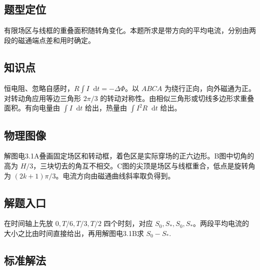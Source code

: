 \documentclass[UTF8,fontset=fandol,a4paper,11pt]{ctexart}
\newcommand{\dd}{\mathop{}\!\mathrm{d}}
\begin{document}


\subsection*{题型定位}

有限场区与线框的重叠面积随转角变化。本题所求是带方向的平均电流，分别由两段的磁通端点差和用时确定。



\subsection*{知识点}

恒电阻、忽略自感时，$R\int I\dd t=-\Delta\Phi$。以 $ABCA$ 为绕行正向，向外磁通为正。对转动角应用等边三角形 $2\pi/3$ 的转动对称性。由相似三角形或切线多边形求重叠面积。有向电量由 $\int I\dd t$ 给出，热量由 $\int I^2R\dd t$ 给出。



\subsection*{物理图像}

解图电3.1A叠画固定场区和转动框，着色区是实际穿场的正六边形。B图中切角的高为 $H/3$，三块切去的角互不相交。C图的尖顶是场区与线框重合，低点是旋转角为 $(2k+1)\pi/3$。电流方向由磁通曲线斜率取负得到。



\subsection*{解题入口}

在时间轴上先放 $0,T/6,T/3,T/2$ 四个时刻，对应 $S_0,S_*,S_0,S_*$。两段平均电流的大小之比由时间直接给出，再用解图电3.1B求 $S_0-S_*$.


\subsection*{标准解法}
\end{document}

